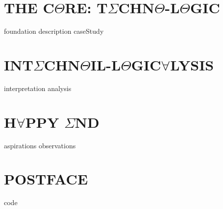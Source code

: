 \documentclass{thesis} %
\begin{document}
\part{\texorpdfstring{THE C$\Theta$RE: T$\Sigma$CHN$\Theta$-L$\Theta$GIC}{THE CORE: TECHNO-LOGIC}}
{foundation}
{description}
{caseStudy}

\part{\texorpdfstring{INT$\Sigma$CHN$\Theta$IL-L$\Theta$GIC$\forall$LYSIS}{INTECHNOIL-LOGICALYSIS}}
{interpretation}
{analysis}

\part{\texorpdfstring{H$\forall$PPY $\Sigma$ND}{SO LONG, AND THANKS FOR ALL THE FISH}}
{aspirations}
{observations}

\appendix

\part*{\texorpdfstring{POSTFACE}{POSTFACE}}
{code}
\clearpage

\pagestyle{plain}
{}
\clearpage

{}
\printnoidxglossary
\clearpage
\end{document}
